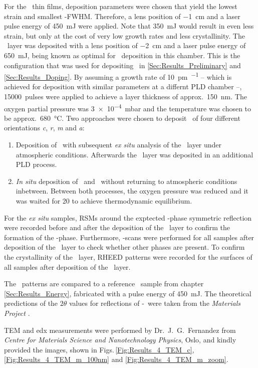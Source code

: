 For the \cro\ thin films, deposition parameters were chosen that yield the lowest strain and smallest \textomega-FWHM.
Therefore, a lens position of \qty{-1}{\cm} and a laser pulse energy of \qty{450}{\milli\joule} were applied.
Note that \qty{350}{\milli\joule} would result in even less strain, but only at the cost of very low growth rates and less crystallinity.
The \gao\ layer was deposited with a lens position of \qty{-2}{\cm} and a laser pulse energy of \qty{650}{\milli\joule}, being known as optimal for \agao\ deposition in this chamber.
This is the configuration that was used for depositing \cro\ in \ref{Sec:Results_Preliminary} and \ref{Sec:Results_Doping}.
By assuming a growth rate of \qty{10}{\pm\per\pulse} -- which is achieved for deposition with similar parameters at a differnt PLD chamber --, \qty{15000}{pulses} were applied to achieve a layer thickness of approx.\ \qty{150}{\nm}.
The oxygen partial pressure was \qty{3e-4}{\milli\bar} and the temperature was chosen to be approx.\ \qty{680}{\degreeCelsius}.
Two approaches were chosen to deposit \agao\ of four different orientations \textit{c}, \textit{r}, \textit{m} and \textit{a}:
\begin{enumerate}
    \item Deposition of \cro\ with subsequent \textit{ex situ} analysis of the \cro\ layer under atmospheric conditions.
    Afterwards the \gao\ layer was deposited in an additional PLD process.
    \item \textit{In situ} deposition of \cro\ and \gao\ without returning to atmospheric conditions inbetween.
    Between both processes, the oxygen pressure was reduced and it was waited for \qty{20}{\min} to achieve thermodynamic equilibrium.
\end{enumerate}

For the \textit{ex situ} samples, \glspl{RSM} around the exptected \textalpha-phase symmetric reflection were recorded before and after the deposition of the \gao\ layer to confirm the formation of the \textalpha-phase.
Furthermore, \thetaomega-scans were performed for all samples after deposition of the \gao\ layer to check whether other phases are present.
To confirm the crystallinity of the \gao\ layer, \gls{RHEED} patterns were recorded for the surfaces of all samples after deposition of the \gao\ layer.
    

The \thetaomega\ patterns are compared to a reference \cro\ sample from chapter \ref{Sec:Results_Energy}, fabricated with a pulse energy of \qty{450}{\milli\joule}.
The theoretical predictions of the $2\theta$ values for reflections of \textbeta-\gao\ were taken from the \textit{Materials Project}
    \cite[mp-886]{MaterialsProject}.

\gls{TEM} and \gls{edx} measurements were performed by Dr.\ J.\ G.\  Fernandez from \textit{Centre for Materials Science and Nanotechnology Physics}, Oslo, and kindly provided the images, shown in Figs.\,\ref{Fig:Results_4_TEM_c}, \ref{Fig:Results_4_TEM_m_100nm} and \ref{Fig:Results_4_TEM_m_zoom}.